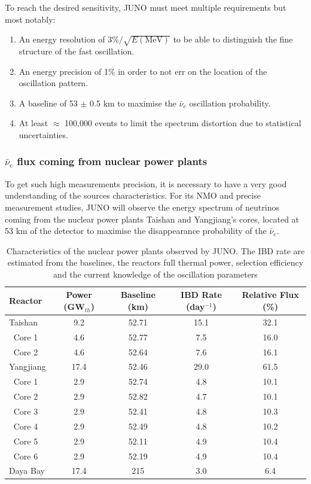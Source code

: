 To reach the desired sensitivity, JUNO must meet multiple requirements but most notably:
\begin{enumerate}
  \item An energy resolution of $3\%/\sqrt{E\mathrm{(MeV)}}$ to be able to distinguish the fine structure of the fast oscillation.
  \item An energy precision of 1\% in order to not err on the location of the oscillation pattern.
  \item A baseline of 53 $\pm$ 0.5 km to maximise the $\bar{\nu}_e$ oscillation probability.
  \item At least $\approx$ 100,000 events to limit the spectrum distortion due to statistical uncertainties.
\end{enumerate}

\subsubsection{$\bar{\nu}_e$ flux coming from nuclear power plants}
\label{sec:juno:nu_e_flux}

To get such high measurements precision, it is necessary to have a very good understanding of the sources characteristics. For its NMO and precise measurement studies, JUNO will observe the energy spectrum of neutrinos coming from the nuclear power plants Taishan and Yangjiang's cores, located at 53 km of the detector to maximise the disappearance probability of the $\bar{\nu}_e$.

\begin{table}[ht]
  \centering
  \begin{tabular}{l c c c c}
    \hline
    Reactor & Power (GW$_{th}$) & Baseline (km) & IBD Rate (day$^{-1}$) & Relative Flux (\%) \\
    \hline
    Taishan    & 9.2  & 52.71 & 15.1 & 32.1 \\
    $~$ Core 1 & 4.6  & 52.77 & 7.5  & 16.0 \\
    $~$ Core 2 & 4.6  & 52.64 & 7.6  & 16.1 \\
    Yangjiang  & 17.4 & 52.46 & 29.0 & 61.5 \\
    $~$ Core 1 & 2.9  & 52.74 & 4.8  & 10.1 \\
    $~$ Core 2 & 2.9  & 52.82 & 4.7  & 10.1 \\
    $~$ Core 3 & 2.9  & 52.41 & 4.8  & 10.3 \\
    $~$ Core 4 & 2.9  & 52.49 & 4.8  & 10.2 \\
    $~$ Core 5 & 2.9  & 52.11 & 4.9  & 10.4 \\
    $~$ Core 6 & 2.9  & 52.19 & 4.9  & 10.4 \\
    Daya Bay   & 17.4 & 215   & 3.0  & 6.4  \\
    \hline
  \end{tabular}
  \caption{Characteristics of the nuclear power plants observed by JUNO. The IBD rate are estimated from the baselines, the reactors full thermal power, selection efficiency and the current knowledge of the oscillation parameters}
  \label{tab:juno:power_plants}
\end{table}

